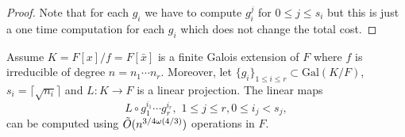 \begin{proof}
Note that for each $g_i$ we have to compute $g_i^j$ for $0 \leq j \leq s_i$ but this is just a one time computation for each $g_i$
which does not change the total cost.
\end{proof}

\begin{lemma}\label{lem:transmodcomp}
Assume $K = F[x]/f = F[\bar{x}]$ is a finite Galois extension of $F$ where $f$ is irreducible of degree $n = n_1\cdots n_r$. Moreover,
let $ \lbrace g_i \rbrace_{1\leq i \leq r} \subset \mathrm{Gal}(K/F) $, $s_i = \lceil \sqrt{n_i} \rceil$
 and $L: K\rightarrow F$ is a linear projection. The linear maps
$$L \circ g_1^{i_1} \cdots g_r^{i_r}, \,\, 1\leq j \leq r, 0 \leq i_j < s_j, $$ can be computed using $\tilde{O}(n^{3/4 \omega(4/3)})$ operations in $F$. 
\end{lemma} 


